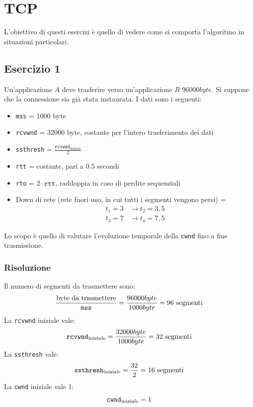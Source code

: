 \documentclass[a4paper]{article}
\begin{document}
\section{TCP}
L'obiettivo di questi esercizi è quello di vedere come si comporta l'algoritmo in situazioni 
particolari.
\subsection{Esercizio 1}
Un'applicazione \( A \) deve trasferire verso un'applicazione \( B \) \( 96000 byte \).
Si suppone che la connessione sia già stata instaurata. I dati sono i seguenti:
\begin{itemize}
  \item \texttt{mss} = 1000 byte
  \item \texttt{rcvwnd} = 32000 byte, costante per l'intero trasferimento dei dati
  \item \texttt{ssthresh} = \( \frac{\texttt{rcvwnd}_{\text{iniziale}}}{2} \) 
  \item \texttt{rtt} = costante, pari a \( 0.5 \) secondi
  \item \texttt{rto} = \( 2 \cdot \texttt{rtt} \), raddoppia in caso di perdite sequenziali
  \item Down di rete (rete fuori uso, in cui tutti i segmenti vengono persi) = 
    \[
    \begin{aligned}
      t_1 = 3 &\to t_2 = 3,5\\
      t_3 = 7 &\to t_4 = 7,5
    \end{aligned}
    \] 
\end{itemize}
Lo scopo è quello di valutare l'evoluzione temporale della \texttt{cwnd} fino a fine
trasmissione.

\subsubsection{Risoluzione}
Il numero di segmenti da trasmettere sono:
\[
  \frac{\text{byte da trasmettere}}{\text{\texttt{mss}}} = \frac{96000 byte}{1000 byte}
  = 96 \text{ segmenti}
\] 
La \texttt{rcvwnd} iniziale vale:
\[
  \text{\texttt{rcvwnd}}_{\text{iniziale}} = \frac{32000 byte}{1000 byte} = 32 \text{ segmenti}
\] 
La \texttt{ssthresh} vale:
\[
  \text{\texttt{ssthresh}}_{\text{iniziale}} = \frac{32}{2} = 16 \text{ segmenti}
\]
La \texttt{cwnd} iniziale vale 1:
\[
  \text{\texttt{cwnd}}_{\text{iniziale}} = 1
\] 
\end{document}
